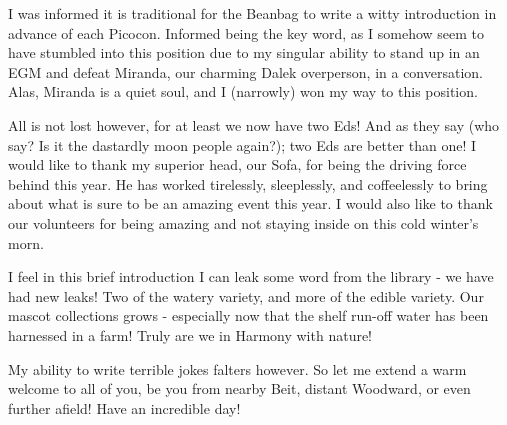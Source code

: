 I was informed it is traditional for the Beanbag to write a witty introduction in advance of each Picocon. Informed being the key word, as I somehow seem to have stumbled into this position due to my singular ability to stand up in an EGM and defeat Miranda, our charming Dalek overperson, in a conversation. Alas, Miranda is a quiet soul, and I (narrowly) won my way to this position.

All is not lost however, for at least we now have two Eds! And as they say (who say? Is it the dastardly moon people again?); two Eds are better than one! I would like to thank my superior head, our Sofa, for being the driving force behind this year. He has worked tirelessly, sleeplessly, and coffeelessly to bring about what is sure to be an amazing event this year. I would also like to thank our volunteers for being amazing and not staying inside on this cold winter's morn. 

I feel in this brief introduction I can leak some word from the library - we have had new leaks! Two of the watery variety, and more of the edible variety. Our mascot collections grows - especially now that the shelf run-off water has been harnessed in a farm! Truly are we in Harmony with nature!

My ability to write terrible jokes falters however. So let me extend a warm welcome to all of you, be you from nearby Beit, distant Woodward, or even further afield! Have an incredible day!